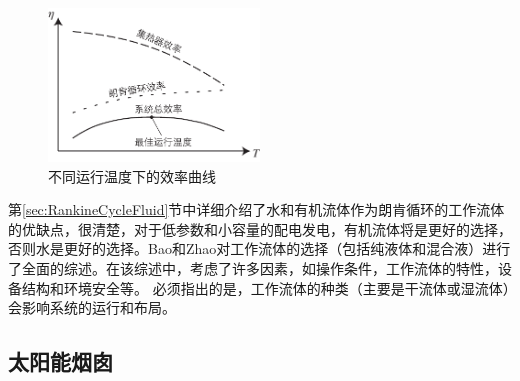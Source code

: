 \begin{figure}[!ht]
\centering 
\includegraphics[width=0.5\textwidth]{fig/Efficiency}
\caption{不同运行温度下的效率曲线}\label{fig:Efficiency}
\end{figure}

第\ref{sec:RankineCycleFluid}节中详细介绍了水和有机流体作为朗肯循环的工作流体的优缺点，很清楚，对于低参数和小容量的配电发电，有机流体将是更好的选择，否则水是更好的选择。Bao和Zhao\cite{Bao2013}对工作流体的选择（包括纯液体和混合液）进行了全面的综述。在该综述中，考虑了许多因素，如操作条件，工作流体的特性，设备结构和环境安全等。
必须指出的是，工作流体的种类（主要是干流体或湿流体）会影响系统的运行和布局。

\subsection{太阳能烟囱}

